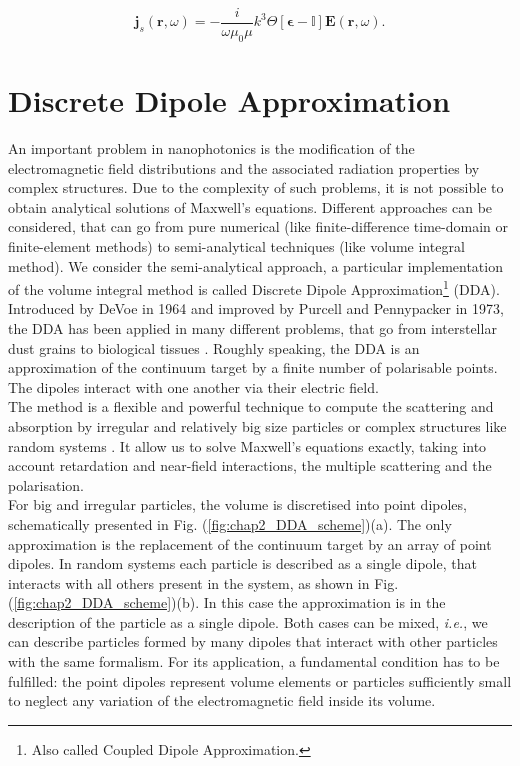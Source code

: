 \begin{equation}
\mathbf{j}_s\left(\mathbf{r},\omega\right) = -\frac{i}{\omega \mu_{0}\mu}k^3\Theta\left[\boldsymbol{\epsilon}-\mathbb{I}\right]\mathbf{E}\left(\mathbf{r},\omega\right).
\end{equation}


\section{Discrete Dipole Approximation\label{chap:chap2_DDA}}

An important problem in nanophotonics is the modification of the electromagnetic field distributions and the associated radiation properties by complex structures. Due to the complexity of such problems, it is not possible to obtain analytical solutions of Maxwell's equations. Different approaches can be considered, that can go from pure numerical (like finite-difference time-domain or finite-element methods) to semi-analytical techniques (like volume integral method). We consider the semi-analytical approach, a particular implementation of the volume integral method is called Discrete Dipole Approximation\footnote{Also called Coupled Dipole Approximation.} (DDA).\\
Introduced by DeVoe \cite{devoe1964optical} in 1964 and improved by Purcell and Pennypacker \cite{Purcell_1973} in 1973, the DDA has been applied in many different problems, that go from interstellar dust grains \cite{draine1988discrete} to biological tissues \cite{yurkin2005experimental}. Roughly speaking, the DDA is an approximation of the continuum target by a finite number of polarisable points. The dipoles interact with one another via their electric field.\\
The method is a flexible and powerful technique to compute the scattering and absorption by irregular and relatively big size particles \cite{draine1988discrete, draine1994discrete, draine2008discrete} or complex structures like random systems \cite{Froufe_PRA_2007}. It allow us to solve Maxwell's equations exactly, taking into account retardation and near-field interactions, the multiple scattering and the polarisation.\\
For big and irregular particles, the volume is discretised into point dipoles, schematically presented in Fig. (\ref{fig:chap2_DDA_scheme})(a). The only approximation is the replacement of the continuum target by an array of point dipoles. In random systems each particle is described as a single dipole, that interacts with all others present in the system, as shown in Fig. (\ref{fig:chap2_DDA_scheme})(b). In this case the approximation is in the description of the particle as a single dipole. Both cases can be mixed, \textit{i.e.}, we can describe particles formed by many dipoles that interact with other particles with the same formalism.  
For its application, a fundamental condition has to be fulfilled: the point dipoles represent volume elements or particles sufficiently small to neglect any variation of the electromagnetic field inside its volume.

